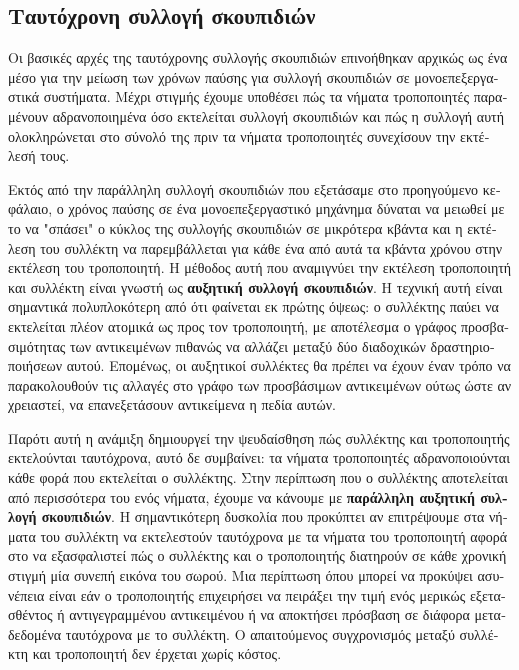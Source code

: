\begin{greek}
\chapter{Ταυτόχρονη συλλογή σκουπιδιών}\label{ch:conc}     

Οι βασικές αρχές της ταυτόχρονης συλλογής σκουπιδιών επινοήθηκαν
αρχικώς ως ένα μέσο για την μείωση των χρόνων παύσης για συλλογή
σκουπιδιών σε μονοεπεξεργαστικά συστήματα. Μέχρι στιγμής  έχουμε
υποθέσει πώς τα νήματα τροποποιητές παραμένουν αδρανοποιημένα
όσο εκτελείται συλλογή σκουπιδιών και πώς η συλλογή αυτή
ολοκληρώνεται στο σύνολό της πριν τα νήματα τροποποιητές
συνεχίσουν την εκτέλεσή τους.

Εκτός από την παράλληλη συλλογή σκουπιδιών που εξετάσαμε στο
προηγούμενο κεφάλαιο, ο χρόνος παύσης σε ένα μονοεπεξεργαστικό
μηχάνημα δύναται να μειωθεί με το να "σπάσει" ο κύκλος της 
συλλογής σκουπιδιών σε μικρότερα κβάντα και η εκτέλεση του
συλλέκτη να παρεμβάλλεται για κάθε ένα από αυτά τα κβάντα
χρόνου στην εκτέλεση του τροποποιητή. Η μέθοδος αυτή που
αναμιγνύει την εκτέλεση τροποποιητή και συλλέκτη είναι γνωστή
ως \textbf{αυξητική συλλογή σκουπιδιών}. Η τεχνική αυτή είναι
σημαντικά πολυπλοκότερη από ότι φαίνεται εκ πρώτης όψεως: ο
συλλέκτης παύει να εκτελείται πλέον ατομικά ως προς τον
τροποποιητή, με αποτέλεσμα ο γράφος προσβασιμότητας των
αντικειμένων πιθανώς να αλλάζει μεταξύ δύο διαδοχικών
δραστηριοποιήσεων αυτού. Επομένως, οι αυξητικοί συλλέκτες θα
πρέπει να έχουν έναν τρόπο να παρακολουθούν τις αλλαγές στο
γράφο των προσβάσιμων αντικειμένων ούτως ώστε αν χρειαστεί,
να επανεξετάσουν αντικείμενα η πεδία αυτών.

Παρότι αυτή η ανάμιξη δημιουργεί την ψευδαίσθηση πώς συλλέκτης
και τροποποιητής εκτελούνται ταυτόχρονα, αυτό δε συμβαίνει:
τα νήματα τροποποιητές αδρανοποιούνται κάθε φορά που εκτελείται
ο συλλέκτης. Στην περίπτωση που ο συλλέκτης αποτελείται από
περισσότερα του ενός νήματα, έχουμε να κάνουμε με
\textbf{παράλληλη αυξητική συλλογή σκουπιδιών}. Η σημαντικότερη
δυσκολία που προκύπτει αν επιτρέψουμε στα νήματα του συλλέκτη
να εκτελεστούν ταυτόχρονα με τα νήματα του τροποποιητή αφορά
στο να εξασφαλιστεί πώς ο συλλέκτης και ο τροποποιητής
διατηρούν σε κάθε χρονική στιγμή μία συνεπή εικόνα του σωρού.
Μια περίπτωση όπου μπορεί να προκύψει ασυνέπεια είναι εάν ο
τροποποιητής επιχειρήσει να πειράξει την τιμή ενός μερικώς
εξετασθέντος ή αντιγεγραμμένου αντικειμένου ή να αποκτήσει
πρόσβαση σε διάφορα μεταδεδομένα ταυτόχρονα με το συλλέκτη.
Ο απαιτούμενος συγχρονισμός μεταξύ συλλέκτη και τροποποιητή
δεν έρχεται χωρίς κόστος.
 

\end{greek}
